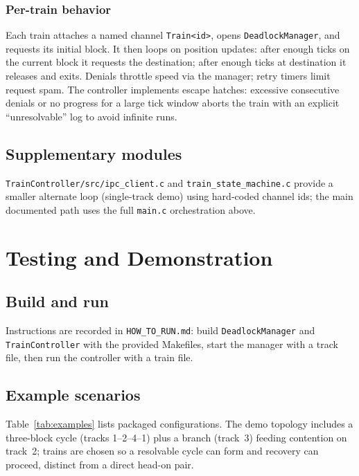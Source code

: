 \documentclass[11pt,a4paper]{article}
\begin{document}
\subsubsection{Per-train behavior}
Each train attaches a named channel \texttt{Train<id>}, opens \texttt{DeadlockManager}, and requests its initial block. It then loops on position updates: after enough ticks on the current block it requests the destination; after enough ticks at destination it releases and exits. Denials throttle speed via the manager; retry timers limit request spam. The controller implements escape hatches: excessive consecutive denials or no progress for a large tick window aborts the train with an explicit ``unresolvable'' log to avoid infinite runs.

\subsection{Supplementary modules}
\texttt{TrainController/src/ipc\_client.c} and \texttt{train\_state\_machine.c} provide a smaller alternate loop (single-track demo) using hard-coded channel ids; the main documented path uses the full \texttt{main.c} orchestration above.

\section{Testing and Demonstration}

\subsection{Build and run}
Instructions are recorded in \texttt{HOW\_TO\_RUN.md}: build \texttt{DeadlockManager} and \texttt{TrainController} with the provided Makefiles, start the manager with a track file, then run the controller with a train file.

\subsection{Example scenarios}
Table~\ref{tab:examples} lists packaged configurations. The demo topology includes a three-block cycle (tracks 1--2--4--1) plus a branch (track~3) feeding contention on track~2; trains are chosen so a resolvable cycle can form and recovery can proceed, distinct from a direct head-on pair.
\end{document}
